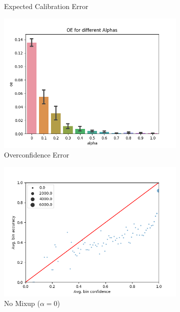 \documentclass{article}
\begin{document}
\begin{figure}[h]
\begin{subfigure}[b]{0.31\textwidth}
         \caption{Expected Calibration Error}
     \end{subfigure}
     \begin{subfigure}[b]{0.31\textwidth}
         \centering
         \includegraphics[width=\textwidth]{images/stl10/oeValpha.png}
         \caption{Overconfidence Error}
     \end{subfigure}
     \begin{subfigure}[b]{0.31\textwidth}
         \centering
         \noindent\includegraphics[width=\textwidth]{images/stl10/scatterplot_0.png}
         \caption{No Mixup ($\alpha=0$)}
     \end{subfigure}
     \begin{subfigure}[b]{0.31\textwidth}

\end{subfigure}
\end{figure}
\end{document}
